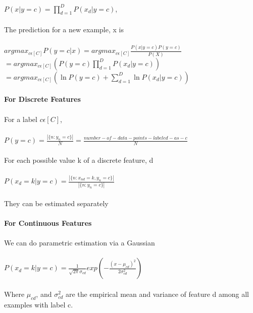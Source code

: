 \documentclass{article}
\begin{document}
\paragraph{}
\(P(x|y=c)=\prod_{d=1}^D P(x_d |y=c)\),\\\\
The prediction for a new example, x is
\paragraph{}
\(argmax_{c\epsilon[C]}P(y=c|x)=argmax_{c\epsilon[C]}\frac{P(x|y=c)P(y=c)}{P(X)}\)\\
\(=argmax_{c\epsilon[C]}(P(y=c) \prod_{d=1}^D P(x_d|y=c))\)\\
\(=argmax_{c\epsilon[C]}(\ln P(y=c) + \sum_{d=1}^D \ln P(x_d|y=c))\)\\
\paragraph{For Discrete Features}
\paragraph{}
For a label \(c\epsilon[C]\),
\paragraph{}
\(P(y=c)=\frac{|\{n:y_n=c\}|}{N}=\frac{number-of-data-points-labeled-as-c}{N}\)\\\\
For each possible value k of a discrete feature, d
\paragraph{}
\(P(x_d=k|y=c)=\frac{|\{n:x_{nd}=k, y_n=c\}|}{|\{n:y_n=c\}|}\)\\\\
They can be estimated separately
\paragraph{For Continuous Features}
\paragraph{}
We can do parametric estimation via a Gaussian
\paragraph{}
\(P(x_d=k|y=c)=\frac{1}{\sqrt{2\pi}\sigma_{cd}}exp(-\frac{(x-\mu_{cd})^2}{2\sigma^2_{cd}})\)\\\\
Where \(\mu_{cd}\), and \(\sigma^2_{cd}\) are the empirical mean and variance of feature d among all examples with label c.
\end{document}
